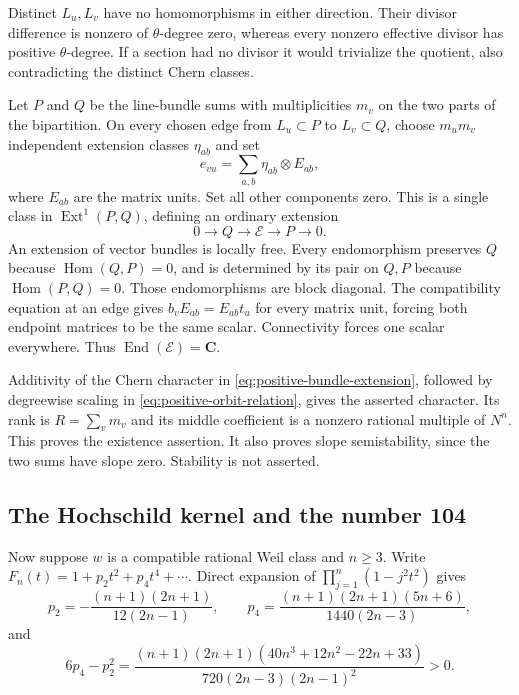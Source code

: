 \documentclass[11pt]{article}
\theoremstyle{definition}
\theoremstyle{remark}
\begin{document}
Distinct $L_u,L_v$ have no homomorphisms in either direction.
Their divisor difference is nonzero of $\theta$-degree zero,
whereas every nonzero effective divisor has positive $\theta$-degree.
If a section had no divisor it would trivialize the quotient,
also contradicting the distinct Chern classes.

Let $P$ and $Q$ be the line-bundle sums with multiplicities $m_v$
on the two parts of the bipartition.  On every chosen edge from
$L_u\subset P$ to $L_v\subset Q$, choose $m_um_v$ independent
extension classes $\eta_{ab}$ and set
\[
 e_{vu}=\sum_{a,b}\eta_{ab}\otimes E_{ab},
\]
where $E_{ab}$ are the matrix units.  Set all other components zero.
This is a single class in $\operatorname{Ext}^1(P,Q)$, defining
an ordinary extension
\begin{equation}
 0\longrightarrow Q\longrightarrow\mathcal E
                   \longrightarrow P\longrightarrow0.
 \label{eq:positive-bundle-extension}
\end{equation}
An extension of vector bundles is locally free.  Every endomorphism
preserves $Q$ because $\operatorname{Hom}(Q,P)=0$, and is determined
by its pair on $Q,P$ because $\operatorname{Hom}(P,Q)=0$.
Those endomorphisms are block diagonal.  The compatibility equation
at an edge gives $b_vE_{ab}=E_{ab}t_u$ for every matrix unit, forcing
both endpoint matrices to be the same scalar.  Connectivity forces
one scalar everywhere.  Thus $\operatorname{End}(\mathcal E)=\mathbf C$.

Additivity of the Chern character in
\eqref{eq:positive-bundle-extension}, followed by degreewise scaling
in \eqref{eq:positive-orbit-relation}, gives the asserted character.
Its rank is $R=\sum_vm_v$ and its middle coefficient is a nonzero
rational multiple of $N^n$.  This proves the existence assertion.
It also proves slope semistability, since the two sums have slope
zero.  Stability is not asserted.

\subsection{The Hochschild kernel and the number 104}

Now suppose $w$ is a compatible rational Weil class and $n\ge3$.
Write $F_n(t)=1+p_2t^2+p_4t^4+\cdots$.  Direct expansion of
$\prod_{j=1}^n(1-j^2t^2)$ gives
\[
 p_2=-\frac{(n+1)(2n+1)}{12(2n-1)},\qquad
 p_4=\frac{(n+1)(2n+1)(5n+6)}{1440(2n-3)},
\]
and
\begin{equation}
 6p_4-p_2^2=
 \frac{(n+1)(2n+1)(40n^3+12n^2-22n+33)}
 {720(2n-3)(2n-1)^2}>0.
 \label{eq:positive-rank-minor}
\end{equation}
\end{document}
